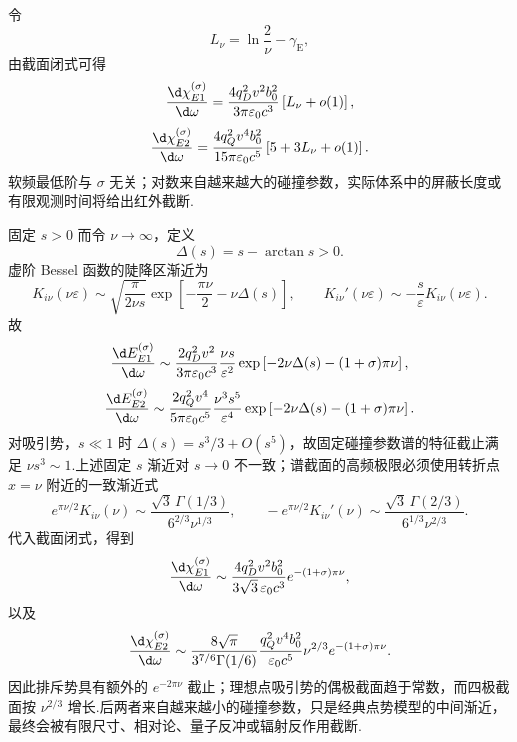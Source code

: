 令
\begin{equation}
 L_\nu=\ln\frac{2}{\nu}-\gamma_{\mathrm E},
\end{equation}
由截面闭式可得
\begin{equation}
 \frac{\d\chi_{E1}^{(\sigma)}}{\d\omega}
 =\frac{4q_D^2v^2b_0^2}{3\pi\varepsilon_0c^3}
 \left[L_\nu+o(1)\right],
 \label{eq:E1-cross-soft}
\end{equation}
\begin{equation}
 \frac{\d\chi_{E2}^{(\sigma)}}{\d\omega}
 =\frac{4q_Q^2v^4b_0^2}{15\pi\varepsilon_0c^5}
 \left[5+3L_\nu+o(1)\right].
 \label{eq:E2-cross-soft}
\end{equation}
软频最低阶与 $\sigma$ 无关；对数来自越来越大的碰撞参数，实际体系中的屏蔽长度或有限观测时间将给出红外截断.

固定 $s>0$ 而令 $\nu\to\infty$，定义
\begin{equation}
 \Delta(s)=s-\arctan s>0.
\end{equation}
虚阶 Bessel 函数的陡降区渐近为
\begin{equation}
 K_{i\nu}(\nu\varepsilon)
 \sim\sqrt{\frac{\pi}{2\nu s}}
 \exp\left[-\frac{\pi\nu}{2}-\nu\Delta(s)\right],
 \qquad
 K_{i\nu}'(\nu\varepsilon)
 \sim-\frac{s}{\varepsilon}K_{i\nu}(\nu\varepsilon).
 \label{eq:K-large-order-fixed-s}
\end{equation}
故
\begin{equation}
 \frac{\d E_{E1}^{(\sigma)}}{\d\omega}
 \sim
 \frac{2q_D^2v^2}{3\pi\varepsilon_0c^3}
 \frac{\nu s}{\varepsilon^2}
 \exp\left[-2\nu\Delta(s)-(1+\sigma)\pi\nu\right],
 \label{eq:E1-hard-fixed-b}
\end{equation}
\begin{equation}
 \frac{\d E_{E2}^{(\sigma)}}{\d\omega}
 \sim
 \frac{2q_Q^2v^4}{5\pi\varepsilon_0c^5}
 \frac{\nu^3s^5}{\varepsilon^4}
 \exp\left[-2\nu\Delta(s)-(1+\sigma)\pi\nu\right].
 \label{eq:E2-hard-fixed-b}
\end{equation}
对吸引势，$s\ll1$ 时 $\Delta(s)=s^3/3+O(s^5)$，故固定碰撞参数谱的特征截止满足 $\nu s^3\sim1$.上述固定 $s$ 渐近对 $s\to0$ 不一致；谱截面的高频极限必须使用转折点 $x=\nu$ 附近的一致渐近式
\begin{equation}
 e^{\pi\nu/2}K_{i\nu}(\nu)
 \sim\frac{\sqrt3\,\Gamma(1/3)}{6^{2/3}\nu^{1/3}},
 \qquad
 -e^{\pi\nu/2}K_{i\nu}'(\nu)
 \sim\frac{\sqrt3\,\Gamma(2/3)}{6^{1/3}\nu^{2/3}}.
 \label{eq:K-turning-point-asymptotics}
\end{equation}
代入截面闭式，得到
\begin{equation}
 \frac{\d\chi_{E1}^{(\sigma)}}{\d\omega}
 \sim
 \frac{4q_D^2v^2b_0^2}{3\sqrt3\,\varepsilon_0c^3}
 e^{-(1+\sigma)\pi\nu},
 \label{eq:E1-cross-hard}
\end{equation}
以及
\begin{equation}
 \frac{\d\chi_{E2}^{(\sigma)}}{\d\omega}
 \sim
 \frac{8\sqrt\pi}{3^{7/6}\Gamma(1/6)}
 \frac{q_Q^2v^4b_0^2}{\varepsilon_0c^5}
 \nu^{2/3}e^{-(1+\sigma)\pi\nu}.
 \label{eq:E2-cross-hard}
\end{equation}
因此排斥势具有额外的 $e^{-2\pi\nu}$ 截止；理想点吸引势的偶极截面趋于常数，而四极截面按 $\nu^{2/3}$ 增长.后两者来自越来越小的碰撞参数，只是经典点势模型的中间渐近，最终会被有限尺寸、相对论、量子反冲或辐射反作用截断.


